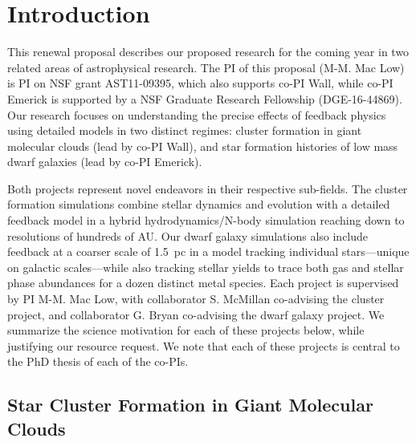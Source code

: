 \documentclass[11pt]{article}
\begin{document}
\maketitle

\section{Introduction}
This renewal proposal describes our proposed research for the coming year in two related areas of astrophysical research. The PI of this proposal (M-M. Mac Low) is PI on NSF grant AST11-09395, which also supports co-PI Wall, while co-PI Emerick is supported by a NSF Graduate Research Fellowship (DGE-16-44869).
Our research focuses on understanding the precise effects of feedback physics 
using detailed models in two distinct regimes: cluster formation in giant molecular clouds (lead by co-PI Wall), and
star formation histories of low mass dwarf galaxies (lead by co-PI Emerick). 

Both projects represent novel endeavors in their respective sub-fields. The cluster formation simulations combine stellar dynamics and evolution with a detailed feedback model in a hybrid hydrodynamics/N-body simulation reaching down to resolutions of hundreds of AU.  Our dwarf galaxy simulations also include feedback at a coarser scale of 1.5~pc in a model tracking individual stars---unique on galactic scales---while also tracking stellar yields to trace both gas and stellar phase abundances for a dozen distinct metal species. Each project is supervised by PI M-M. Mac Low, with collaborator S. McMillan co-advising the cluster project, and collaborator G. Bryan co-advising the dwarf galaxy project. We summarize the science motivation for each of these projects below, while justifying our resource request. We note that each of these projects is central to the PhD thesis of each of the co-PIs.

\subsection{Star Cluster Formation in Giant Molecular Clouds}
\end{document}
